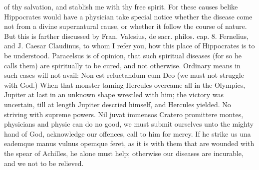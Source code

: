 {of thy salvation, and stablish me with thy free spirit. For these
causes belike Hippocrates would have a physician take special
notice whether the disease come not from a divine supernatural cause,
or whether it follow the course of nature. But this is farther
discussed by Fran. Valesius, de sacr. philos. cap. 8.  Fernelius,
and J. Caesar Claudinus, to whom I refer you, how this place of
Hippocrates is to be understood. Paracelsus is of opinion, that such
spiritual diseases (for so he calls them) are spiritually to be cured,
and not otherwise. Ordinary means in such cases will not avail: Non est
reluctandum cum Deo (we must not struggle with God.) When that
monster-taming Hercules overcame all in the Olympics, Jupiter at last
in an unknown shape wrestled with him; the victory was uncertain, till
at length Jupiter descried himself, and Hercules yielded. No striving
with supreme powers. Nil juvat immensos Cratero promittere montes,
physicians and physic can do no good, we must submit ourselves
unto the mighty hand of God, acknowledge our offences, call to him for
mercy. If he strike us una eademque manus vulnus opemque feret, as it
is with them that are wounded with the spear of Achilles, he alone must
help; otherwise our diseases are incurable, and we not to be relieved.

}
